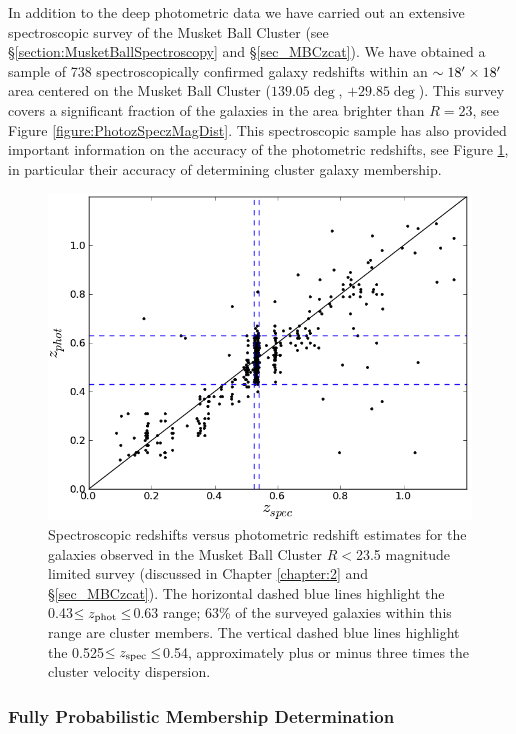In addition to the deep photometric data we have carried out an extensive spectroscopic survey of the Musket Ball Cluster (see \S\ref{section:MusketBallSpectroscopy} and \S\ref{sec_MBCzcat}).
We have obtained a sample of 738 spectroscopically confirmed galaxy redshifts within an $\sim 18\mbox{$^\prime$} \times 18\mbox{$^\prime$}$ area centered on the Musket Ball Cluster ($139.05\deg$, $+29.85\deg$).
This survey covers a significant fraction of the galaxies in the area brighter than $R=23$, see Figure \ref{figure:PhotozSpeczMagDist}.
This spectroscopic sample has also provided important information on the accuracy of the photometric redshifts, see Figure \ref{figure:photzVSspecz}, in particular their accuracy of determining cluster galaxy membership.

\begin{figure}
\centering
\includegraphics[width=5in]{Chapter4/photVSspec.png}
\caption[Spectroscopic versus photometric redshift for the Musket Ball Cluster.]{
Spectroscopic redshifts versus photometric redshift estimates for the galaxies observed in the Musket Ball Cluster $R<$23.5 magnitude limited survey (discussed in Chapter \ref{chapter:2} and \S\ref{sec_MBCzcat}).
The horizontal dashed blue lines highlight the 0.43$\leq z_{\rm phot} \leq$0.63 range;
63\% of the surveyed galaxies within this range are cluster members.
The vertical dashed blue lines highlight the 0.525$\leq z_{\rm spec} \leq$0.54, approximately plus or minus three times the cluster velocity dispersion.
}
\label{figure:photzVSspecz}
\end{figure}


\subsubsection{Fully Probabilistic Membership Determination}

